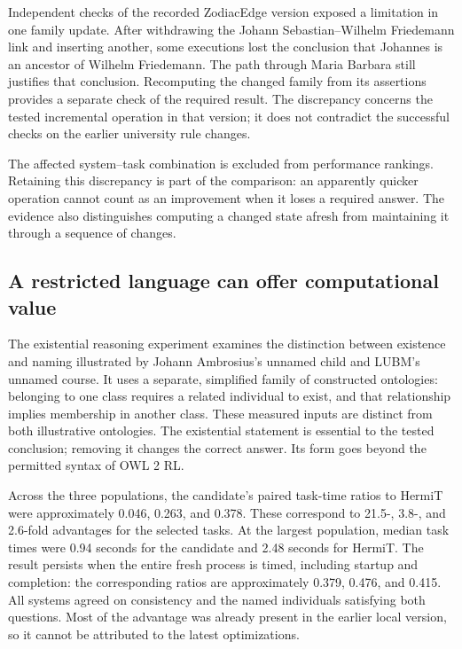 \documentclass{article}
\begin{document}


Independent checks of the recorded ZodiacEdge version exposed a limitation in
one family update. After withdrawing the Johann Sebastian--Wilhelm Friedemann
link and inserting another, some executions lost the conclusion that Johannes
is an ancestor of Wilhelm Friedemann. The path through Maria Barbara still
justifies that conclusion. Recomputing the changed family from its assertions
provides a separate check of the required result. The discrepancy concerns
the tested incremental operation in that version; it does not contradict the
successful checks on the earlier university rule changes.

The affected system--task combination is excluded from performance rankings.
Retaining this discrepancy is part of the comparison: an apparently quicker
operation cannot count as an improvement when it loses a required answer.
The evidence also distinguishes computing a changed state afresh from
maintaining it through a sequence of changes.

\subsection{A restricted language can offer computational value}
The existential reasoning experiment examines the distinction between existence
and naming illustrated by Johann Ambrosius's unnamed child and LUBM's unnamed
course. It uses a separate, simplified family of constructed ontologies:
belonging to one class requires a
related individual to exist, and that relationship implies membership in
another class. These measured inputs are distinct from both illustrative
ontologies. The
existential statement is essential to the tested conclusion; removing it
changes the correct answer. Its form goes beyond the permitted syntax of
OWL 2 RL.

Across the three populations, the candidate's paired task-time ratios to
HermiT were approximately 0.046, 0.263, and 0.378. These correspond to
21.5-, 3.8-, and 2.6-fold advantages for the selected tasks. At the largest
population, median task times were 0.94 seconds for the candidate and
2.48 seconds for HermiT. The result persists
when the entire fresh process is timed, including startup and completion:
the corresponding ratios are approximately 0.379, 0.476, and 0.415.
All systems agreed on consistency and the named individuals satisfying both
questions. Most of the advantage was already present in the earlier local
version, so it cannot be attributed to the latest optimizations.
\end{document}
